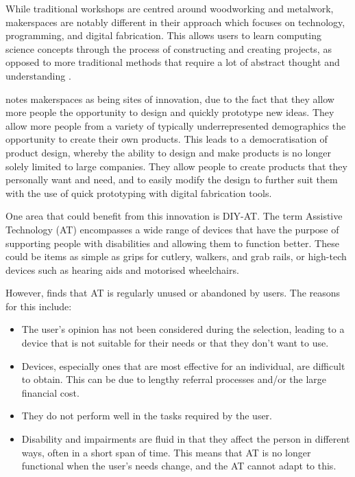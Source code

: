 \documentclass{l4proj}
\begin{document}
While traditional workshops are centred around woodworking and metalwork, makerspaces are notably different in their approach which focuses on technology, programming, and digital fabrication. This allows users to learn computing science concepts through the process of constructing and creating projects, as opposed to more traditional methods that require a lot of abstract thought and understanding \citep{Mar2015}.

\cite{Tan2013} notes makerspaces as being sites of innovation, due to the fact that they allow more people the opportunity to design and quickly prototype new ideas. They allow more people from a variety of typically underrepresented demographics the opportunity to create their own products. This leads to a democratisation of product design, whereby the ability to design and make products is no longer solely limited to large companies. They allow people to create products that they personally want and need, and to easily modify the design to further suit them with the use of quick prototyping with digital fabrication tools. 

One area that could benefit from this innovation is DIY-AT. The term Assistive Technology (AT) encompasses a wide range of devices that have the purpose of supporting people with disabilities and allowing them to function better. These could be items as simple as grips for cutlery, walkers, and grab rails, or high-tech devices such as hearing aids and motorised wheelchairs.

However, \cite{Phi1993} finds that AT is regularly unused or abandoned by users. The reasons for this include: 
\begin{itemize}
    \item The user's opinion has not been considered during the selection, leading to a device that is not suitable for their needs or that they don’t want to use.
    \item Devices, especially ones that are most effective for an individual, are difficult to obtain. This can be due to lengthy referral processes and/or the large financial cost.
    \item They do not perform well in the tasks required by the user.
    \item Disability and impairments are fluid in that they affect the person in different ways, often in a short span of time. This means that AT is no longer functional when the user’s needs change, and the AT cannot adapt to this.     
\end{itemize}   
\end{document}
